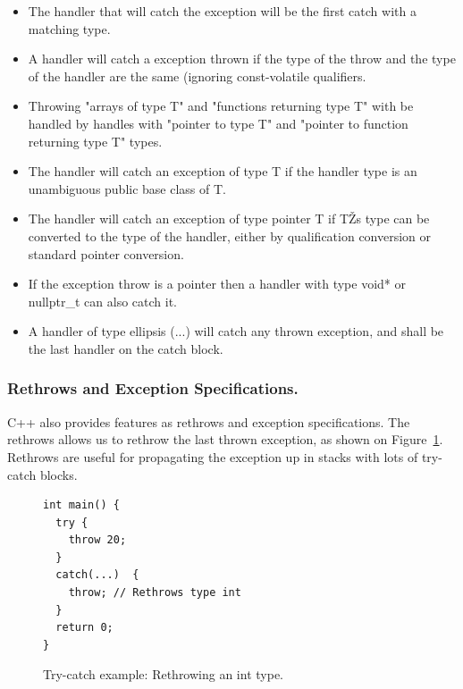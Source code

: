 \documentclass[a4paper]{llncs}
\begin{document}
\begin{itemize}
 \item The handler that will catch the exception will be the first catch with a matching type.
 \item A handler will catch a exception thrown if the type of the throw and the type of the handler are the same (ignoring const-volatile
       qualifiers.
 \item Throwing "arrays of type T" and "functions returning type T" with be handled by handles with "pointer to type T" 
       and "pointer to function returning type T" types.
 \item The handler will catch an exception of type T if the handler type is an unambiguous public base class of T.
 \item The handler will catch an exception of type pointer T if TŽs type can be converted to the type of the handler, either by 
       qualification conversion or standard pointer conversion.
 \item If the exception throw is a pointer then a handler with type void* or nullptr\_t can also catch it.
 \item A handler of type ellipsis (...) will catch any thrown exception, and shall be the last handler on the catch block.
\end{itemize}

\subsubsection{Rethrows and Exception Specifications.}

C++ also provides features as rethrows and exception specifications. The rethrows allows us to rethrow the last thrown exception, 
as shown on Figure~\ref{figure:try-catch-example-rethrowing-an-int-type}. Rethrows are useful for propagating the exception up in stacks with lots of try-catch blocks.

\begin{figure}[ht]
\centering
\begin{minipage}{0.7\textwidth}
\begin{lstlisting}
int main() {
  try {
    throw 20;
  }
  catch(...)  { 
    throw; // Rethrows type int
  }
  return 0;
}
\end{lstlisting}
\end{minipage}
\caption{Try-catch example: Rethrowing an int type.}
\label{figure:try-catch-example-rethrowing-an-int-type}
\end{figure}
\end{document}
